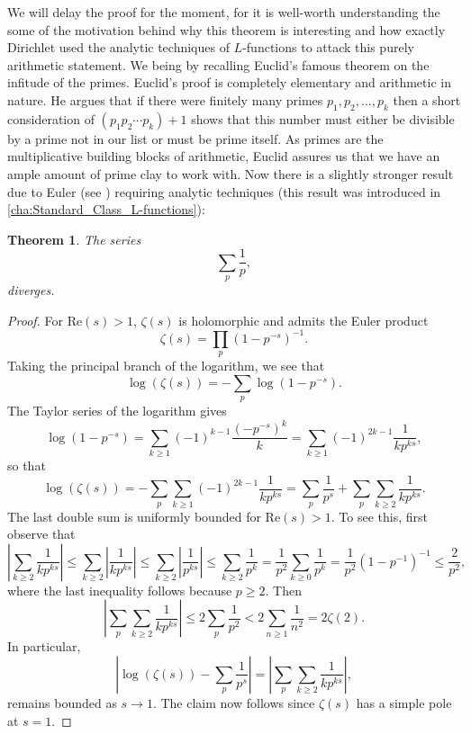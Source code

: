 \documentclass[12pt]{book}
\newtheorem{theorem}{Theorem}[section]
\theoremstyle{definition}\newframedtheorem{method}{Method}
\newcommand{\z}{\zeta}
\newcommand{\<}{\langle}
\renewcommand{\>}{\rangle}
\renewcommand{\Re}{\mathrm{Re}}
\begin{document}
      We will delay the proof for the moment, for it is well-worth understanding the some of the motivation behind why this theorem is interesting and how exactly Dirichlet used the analytic techniques of $L$-functions to attack this purely arithmetic statement. We being by recalling Euclid's famous theorem on the infitude of the primes. Euclid's proof is completely elementary and arithmetic in nature. He argues that if there were finitely many primes $p_{1},p_{2},\ldots,p_{k}$ then a short consideration of $(p_{1}p_{2} \cdots p_{k})+1$ shows that this number must either be divisible by a prime not in our list or must be prime itself. As primes are the multiplicative building blocks of arithmetic, Euclid assures us that we have an ample amount of prime clay to work with. Now there is a slightly stronger result due to Euler (see \cite{euler1737variae}) requiring analytic techniques (this result was introduced in \cref{cha:Standard_Class_L-functions}):

      \begin{theorem}\label{thm:reciprocial_sum_of_primes_diverges}
        The series
        \[
          \sum_{p}\frac{1}{p},
        \]
        diverges.
      \end{theorem}
      \begin{proof}
        For $\Re(s) > 1$, $\z(s)$ is holomorphic and admits the Euler product
        \[
          \z(s) = \prod_{p}(1-p^{-s})^{-1}.
        \]
        Taking the principal branch of the logarithm, we see that
        \[
          \log(\z(s)) = -\sum_{p}\log(1-p^{-s}).
        \]
        The Taylor series of the logarithm gives
        \[
          \log(1-p^{-s}) = \sum_{k \ge 1}(-1)^{k-1}\frac{(-p^{-s})^{k}}{k} = \sum_{k \ge 1}(-1)^{2k-1}\frac{1}{kp^{ks}},
        \]
        so that
        \[
          \log(\z(s)) = -\sum_{p}\sum_{k \ge 1}(-1)^{2k-1}\frac{1}{kp^{ks}} = \sum_{p}\frac{1}{p^{s}}+\sum_{p}\sum_{k \ge 2}\frac{1}{kp^{ks}}.
        \]
        The last double sum is uniformly bounded for $\Re(s) > 1$. To see this, first observe that
        \[
          \left|\sum_{k \ge 2}\frac{1}{kp^{ks}}\right| \le \sum_{k \ge 2}\left|\frac{1}{kp^{ks}}\right| \le \sum_{k \ge 2}\left|\frac{1}{p^{ks}}\right| \le \sum_{k \ge 2}\frac{1}{p^{k}} = \frac{1}{p^{2}}\sum_{k \ge 0}\frac{1}{p^{k}} = \frac{1}{p^{2}}(1-p^{-1})^{-1} \le \frac{2}{p^{2}},
        \]
        where the last inequality follows because $p \ge 2$. Then
        \[
          \left|\sum_{p}\sum_{k \ge 2}\frac{1}{kp^{ks}}\right| \le 2\sum_{p}\frac{1}{p^{2}} < 2\sum_{n \ge 1}\frac{1}{n^{2}} = 2\z(2).
        \]
        In particular,
        \[
          \left|\log(\z(s))-\sum_{p}\frac{1}{p^{s}}\right| = \left|\sum_{p}\sum_{k \ge 2}\frac{1}{kp^{ks}}\right|,
        \]
        remains bounded as $s \to 1$. The claim now follows since $\z(s)$ has a simple pole at $s = 1$.
      \end{proof}
\end{document}
